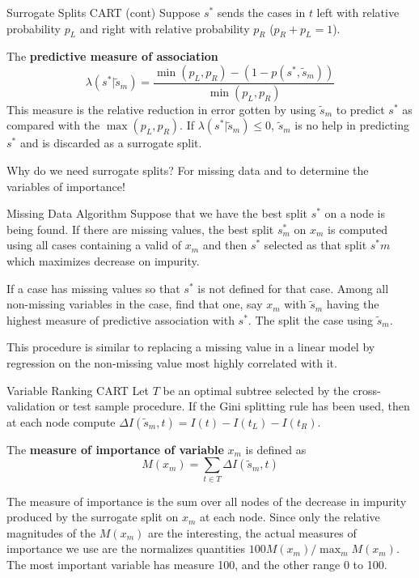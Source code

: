 \documentclass{beamer}
\begin{document}
\begin{frame}{Surrogate Splits CART (cont)}
	Suppose $s^*$ sends the cases in $t$ left with relative probability $p_L$ and right with relative probability $p_R$ ($p_R+p_L=1$).
	
	The \textbf{predictive measure of association} 
	\begin{equation*}
		\lambda(s^*| \tilde{s}_m)= \frac{\min(p_L,p_R)-(1-p(s^*,\tilde{s}_m))}{\min(p_L,p_R)}
	\end{equation*}
	This measure is the relative reduction in error gotten by using $\tilde{s}_m$ to predict $s^*$ as compared with the $\max (p_L,p_R)$. If $\lambda(s^*| \tilde{s}_m)\le 0$, $\tilde{s}_m$ is no help in predicting $s^*$ and is discarded as a surrogate split. 
	
	Why do we need surrogate splits? For missing data and to determine the variables of importance!
	

\end{frame}

\begin{frame}{Missing Data Algorithm}
	Suppose that we have the best split $s^*$ on a node is being found. If there are missing values, the best split $s^*_m$ on $x_m$ is computed using all cases containing a valid of $x_m$ and then $s^*$ selected as that split $s^*m$ which maximizes decrease on impurity.
	
	If a case has missing values so that $s^*$ is not defined for that case. Among all non-missing variables in the case, find that one, say $x_m$ with $\tilde{s}_m$ having the highest measure of predictive association with $s^*$. The split the case using $\tilde{s}_m$.
	
	This procedure is similar to replacing a missing value in a linear model by regression on the non-missing value most highly correlated with it. 
	
\end{frame}

\begin{frame}{Variable Ranking CART}
	Let $T$ be an optimal subtree selected by the cross-validation or test sample procedure. If the Gini splitting rule has been used, then at each node compute $\Delta I(\tilde{s}_m,t)= I(t)-I(t_L)-I(t_R)$.
	
	The \textbf{measure of importance of variable} $x_m$ is defined as
	\begin{equation*}
		M(x_m)= \sum_{t\in T} \Delta I (\tilde{s}_m, t)
	\end{equation*}

	The measure of importance is the sum over all nodes of the decrease in impurity produced by the surrogate split on $x_m$ at each node. Since only the relative magnitudes of the $M(x_m)$ are the interesting, the actual measures of importance we use are the normalizes quantities $100 M(x_m)/\max_m M(x_m)$. The most important variable has measure 100, and the other range 0 to 100.
\end{frame}
\end{document}
